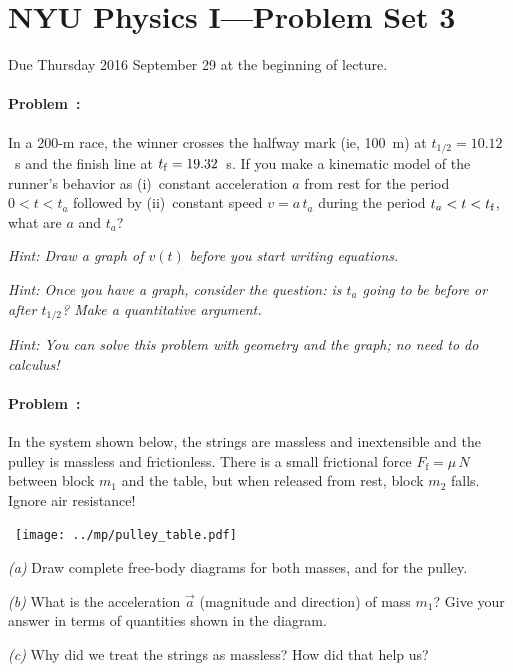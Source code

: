 \documentclass[12pt]{article}
\newcounter{problem}
\begin{document}
\sloppy\sloppypar\raggedbottom\frenchspacing\thispagestyle{empty}

\section*{NYU Physics I---Problem Set 3}

Due Thursday 2016 September 29 at the beginning of lecture.

\paragraph{Problem~\theproblem:}%
In a 200-m race, the winner crosses the halfway mark (ie, 100~m) at
$t_{1/2}=10.12$~s and the finish line at $t_{\rm f}=19.32$~s.  If you
make a kinematic model of the runner's behavior as (i)~constant
acceleration $a$ from rest for the period $0<t<t_a$ followed by
(ii)~constant speed $v=a\,t_a$ during the period $t_a<t<t_{\rm f}$,
what are $a$ and $t_a$?

\emph{Hint: Draw a graph of $v(t)$ before you start writing equations.}

\emph{Hint: Once you have a graph, consider the question: is $t_a$
going to be before or after $t_{1/2}$?  Make a quantitative argument.}

\emph{Hint: You can solve this problem with geometry and the graph; no
  need to do calculus!}

\paragraph{Problem~\theproblem:}%

In the system shown below, the strings are massless and inextensible
and the pulley is massless and frictionless.  There is a small
frictional force $F_\mathrm{f}=\mu\,N$ between block $m_1$ and the
table, but when released from rest, block $m_2$ falls. Ignore air
resistance!

\noindent~\hfill\texttt{[image: ../mp/pulley\_table.pdf]}\hfill~

\textsl{(a)} Draw complete free-body diagrams for both masses, and for
the pulley.

\textsl{(b)} What is the acceleration $\vec{a}$ (magnitude and
direction) of mass $m_1$?  Give your answer in terms of quantities
shown in the diagram.

\textsl{(c)} Why did we treat the strings as massless? How did that
help us?
\end{document}
